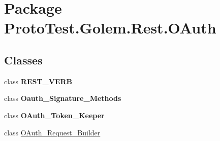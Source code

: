 \hypertarget{namespace_proto_test_1_1_golem_1_1_rest_1_1_o_auth}{\section{Package Proto\-Test.\-Golem.\-Rest.\-O\-Auth}
\label{namespace_proto_test_1_1_golem_1_1_rest_1_1_o_auth}
}
\subsection*{Classes}
\begin{DoxyCompactItemize}
\item 
class {\bfseries R\-E\-S\-T\-\_\-\-V\-E\-R\-B}
\item 
class {\bfseries Oauth\-\_\-\-Signature\-\_\-\-Methods}
\item 
class {\bfseries O\-Auth\-\_\-\-Token\-\_\-\-Keeper}
\item 
class \hyperlink{class_proto_test_1_1_golem_1_1_rest_1_1_o_auth_1_1_o_auth___request___builder}{O\-Auth\-\_\-\-Request\-\_\-\-Builder}
\end{DoxyCompactItemize}
